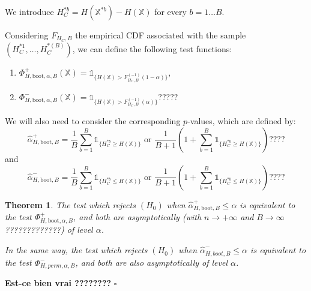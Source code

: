 \documentclass[a4paper,oneside,10pt]{article}
\newtheorem{thm}{Theorem}[subsection]
\newenvironment{dem}{\noindent{\bf Proof :}}{\hfill             %
  $\square$\par \noindent}
\newcommand{\pa}[1]{\ensuremath{\left( #1 \right)}}
\newcommand{\X}{\ensuremath{\mathds{X}}}
\newcommand{\1}[1]{\ensuremath{\mathds{1}_{\{ #1 \}}}}  %
\begin{document}
We introduce $H_C^{* b}=H(\X^{* b})-H(\X)$ for every $b=1\ldots B$.

Considering $F_{H_C,B}$ the empirical CDF associated with the sample $\pa{H_C^{* 1},\ldots,H_C^{* (B)}}$, we can define the following test functions:

\begin{enumerate}
\item $\Phi_{H,\textrm{boot},\alpha,B}^{+}(\X)=\1{H(\X)>F_{H_C,B}^{(-1)}(1-\alpha)},$
\item $\Phi_{H,\textrm{boot},\alpha,B}^{-}(\X)=\1{H(\X)>F_{H_C,B}^{(-1)}(\alpha)} ?????$
\end{enumerate}

We will also need to consider the corresponding $p$-values, which are defined by:
$$\hat{\alpha}^+_{H,\textrm{boot},B}=\frac{1}{B}\sum_{b=1}^{B} \1{H_C^{* b} \geq H(\X)}\textrm{ or }\frac{1}{B+1}\pa{1+\sum_{b=1}^B \1{H_C^{* b}\geq H(\X)}} ????$$
and 
$$\hat{\alpha}^-_{H,\textrm{boot},B}=\frac{1}{B}\sum_{b=1}^{B} \1{H_C^{* b}\leq H(\X)}\textrm{ or }\frac{1}{B+1}\pa{1+\sum_{b=1}^B \1{H_C^{* b}\leq H(\X)}} ????$$

\begin{thm}
The test which rejects $(H_0)$ when $\hat{\alpha}^+_{H,\textrm{boot},B}\leq \alpha$ is equivalent to the test $\Phi_{H,\textrm{boot},\alpha,B}^+$, and both are asymptotically  (with $n\to +\infty$ and $B\to\infty$ ?????????????) of level $\alpha$.

In the same way, the test which rejects $(H_0)$ when $\hat{\alpha}^-_{H,boot,B}\leq \alpha$ is equivalent to the test $ \Phi_{H,perm,\alpha,B}^-$, and both are also asymptotically of level $\alpha$.
\end{thm}

\begin{dem}
{\bf Est-ce bien vrai ????????}
\end{dem}
\end{document}
